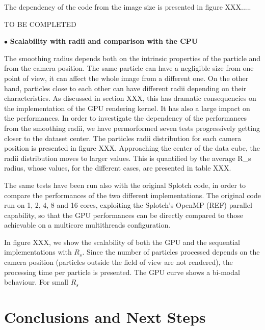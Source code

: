 \documentclass[11pt]{article}
\begin{document}
The dependency of the code from the image size is presented in figure XXX..... 

TO BE COMPLETED 

\noindent$\bullet$ {\bf Scalability with radii and comparison with the CPU}

The smoothing radius depends both on the intrinsic properties of the particle
and from the camera position. The same particle can have a negligible size
from one point of view, it can affect the whole image from a different one. 
On the other hand, particles close to each other can have different radii depending
on their characteristics. As discussed in section XXX, this has dramatic consequencies 
on the implementation of the GPU rendering kernel. It has also a large impact
on the performances. In order to investigate the dependency of the performances from
the smoothing radii, we have permorformed seven tests progressively 
getting closer to the dataset center. The particles radii distribution for each
camera position is presented in figure XXX. Approaching the center of the 
data cube, the radii distribution moves to larger values. This is quantified 
by the average R_s radius, whose values, for the different cases, are presented in 
table XXX.
 
The same tests have been run also with the original Splotch code, in order 
to compare the performances of the two different implementations. The original 
code run on 1, 2, 4, 8 and 16 cores, exploiting the Splotch's OpenMP (REF) parallel
capability, so that the GPU performances can be directly compared to 
those achievable on a multicore multithreads configuration.  

In figure XXX, we show the scalability of both the GPU and the sequential 
implementations with $R_s$. Since the number of particles processed depends on
the camera position (particles outside the field of view are not rendered), 
the processing time per particle is presented. The GPU curve shows a 
bi-modal behaviour. For small $R_s$  

\section{Conclusions and Next Steps}
\end{document}
